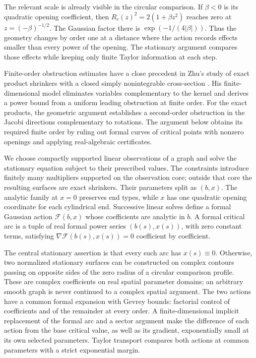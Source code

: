 The relevant scale is already visible in the circular comparison.
If $\beta<0$ is its quadratic opening coefficient, then
$R_c(z)^2=2(1+\beta z^2)$ reaches zero at
$z=(-\beta)^{-1/2}$.  The Gaussian factor there is
$\exp(-1/(4|\beta|))$.  Thus the geometry changes by order one at a
distance where the action records effects smaller than every power of
the opening.  The stationary argument compares those effects while
keeping only finite Taylor information at each step.

Finite-order obstruction estimates have a close precedent in Zhu's
study of exact product shrinkers with a closed simply nonintegrable
cross-section \cite[Section~1.3]{Zhu2024}. His finite-dimensional model
eliminates variables complementary to the kernel and derives a power
bound from a uniform leading obstruction at finite order. For the exact
products, the geometric argument establishes a second-order obstruction
in the Jacobi directions complementary to rotations. The argument below
obtains its required finite order by ruling out formal curves of critical
points with nonzero openings and applying real-algebraic certificates.

We choose compactly supported linear observations of a graph and solve
the stationary equation subject to their prescribed values. The
constraints introduce finitely many multipliers supported on the
observation core; outside that core the resulting surfaces are exact
shrinkers. Their parameters split as $(b,x)$. The analytic family
at $x=0$ preserves end types, while $x$ has one quadratic opening
coordinate for each cylindrical end. Successive linear solves define
a formal Gaussian action $\mathcal F(b,x)$ whose coefficients are
analytic in $b$. A formal critical arc is a tuple of real formal
power series $(b(s),x(s))$, with zero constant terms, satisfying
$\nabla\mathcal F(b(s),x(s))=0$ coefficient by coefficient.

The central stationary assertion is that every such arc has
$x(s)\equiv0$. Otherwise, two normalized stationary surfaces can be
constructed on complex contours passing on opposite sides of the zero
radius of a circular comparison profile. These are complex coefficients
on real spatial parameter domains; an arbitrary smooth graph is never
continued to a complex spatial argument. The two actions have a common
formal expansion with Gevrey bounds: factorial control of coefficients
and of the remainder at every order. A finite-dimensional implicit
replacement of the formal arc and a sector argument make the difference
of each action from the base critical value, as well as its gradient,
exponentially small at its own selected parameters.
Taylor transport compares both actions at common parameters with a
strict exponential margin.

